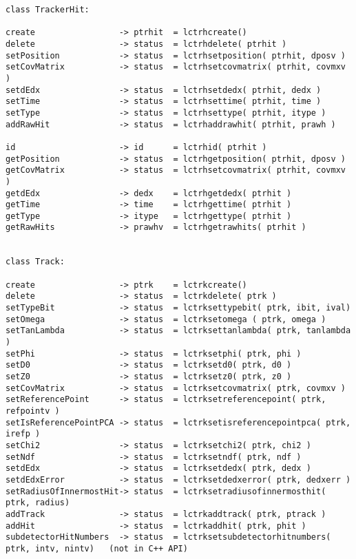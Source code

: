 \begin{scriptsize}
\begin{verbatim}
class TrackerHit:

create                 -> ptrhit  = lctrhcreate()
delete                 -> status  = lctrhdelete( ptrhit )
setPosition            -> status  = lctrhsetposition( ptrhit, dposv )
setCovMatrix           -> status  = lctrhsetcovmatrix( ptrhit, covmxv )
setdEdx                -> status  = lctrhsetdedx( ptrhit, dedx )
setTime                -> status  = lctrhsettime( ptrhit, time )
setType                -> status  = lctrhsettype( ptrhit, itype )
addRawHit              -> status  = lctrhaddrawhit( ptrhit, prawh )

id                     -> id      = lctrhid( ptrhit )
getPosition            -> status  = lctrhgetposition( ptrhit, dposv )
getCovMatrix           -> status  = lctrhsetcovmatrix( ptrhit, covmxv )
getdEdx                -> dedx    = lctrhgetdedx( ptrhit )
getTime                -> time    = lctrhgettime( ptrhit )
getType                -> itype   = lctrhgettype( ptrhit )
getRawHits             -> prawhv  = lctrhgetrawhits( ptrhit )


class Track:

create                 -> ptrk    = lctrkcreate()
delete                 -> status  = lctrkdelete( ptrk )
setTypeBit             -> status  = lctrksettypebit( ptrk, ibit, ival)
setOmega               -> status  = lctrksetomega ( ptrk, omega )
setTanLambda           -> status  = lctrksettanlambda( ptrk, tanlambda )
setPhi                 -> status  = lctrksetphi( ptrk, phi )
setD0                  -> status  = lctrksetd0( ptrk, d0 )
setZ0                  -> status  = lctrksetz0( ptrk, z0 )
setCovMatrix           -> status  = lctrksetcovmatrix( ptrk, covmxv )
setReferencePoint      -> status  = lctrksetreferencepoint( ptrk, refpointv )
setIsReferencePointPCA -> status  = lctrksetisreferencepointpca( ptrk, irefp )
setChi2                -> status  = lctrksetchi2( ptrk, chi2 )
setNdf                 -> status  = lctrksetndf( ptrk, ndf )
setdEdx                -> status  = lctrksetdedx( ptrk, dedx )
setdEdxError           -> status  = lctrksetdedxerror( ptrk, dedxerr )
setRadiusOfInnermostHit-> status  = lctrksetradiusofinnermosthit( ptrk, radius)
addTrack               -> status  = lctrkaddtrack( ptrk, ptrack )
addHit                 -> status  = lctrkaddhit( ptrk, phit )
subdetectorHitNumbers  -> status  = lctrksetsubdetectorhitnumbers( ptrk, intv, nintv)   (not in C++ API)


\end{verbatim}
\end{scriptsize}

